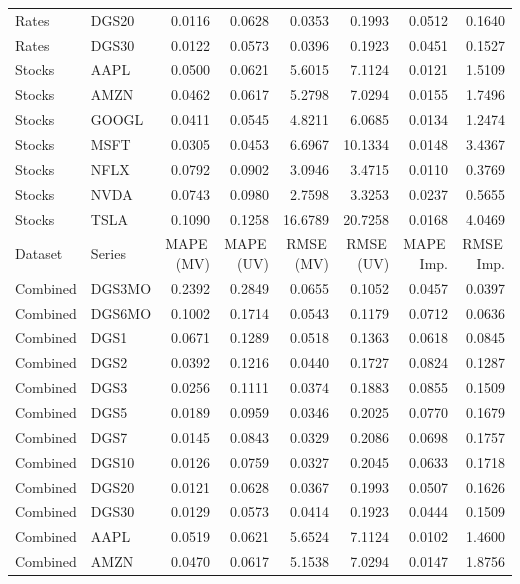 \documentclass[twocolumn]{article}
\begin{document}
\begin{table}
{\begin{tabular}{llrrrrrr}
Rates & DGS20 & 0.0116 & 0.0628 & 0.0353 & 0.1993 & 0.0512 & 0.1640 \\
Rates & DGS30 & 0.0122 & 0.0573 & 0.0396 & 0.1923 & 0.0451 & 0.1527 \\
\midrule
Stocks & AAPL  & 0.0500 & 0.0621 & 5.6015  & 7.1124  & 0.0121 & 1.5109 \\
Stocks & AMZN  & 0.0462 & 0.0617 & 5.2798  & 7.0294  & 0.0155 & 1.7496 \\
Stocks & GOOGL & 0.0411 & 0.0545 & 4.8211  & 6.0685  & 0.0134 & 1.2474 \\
Stocks & MSFT  & 0.0305 & 0.0453 & 6.6967  & 10.1334 & 0.0148 & 3.4367 \\
Stocks & NFLX  & 0.0792 & 0.0902 & 3.0946  & 3.4715  & 0.0110 & 0.3769 \\
Stocks & NVDA  & 0.0743 & 0.0980 & 2.7598  & 3.3253  & 0.0237 & 0.5655 \\
Stocks & TSLA  & 0.1090 & 0.1258 & 16.6789 & 20.7258 & 0.0168 & 4.0469 \\
\bottomrule
Dataset & Series & MAPE\,(MV) & MAPE\,(UV) & RMSE\,(MV) & RMSE\,(UV) & MAPE\,Imp. & RMSE\,Imp. \\
\midrule
Combined & DGS3MO & 0.2392 & 0.2849  & 0.0655  & 0.1052  & 0.0457  & 0.0397  \\
Combined & DGS6MO & 0.1002 & 0.1714  & 0.0543  & 0.1179  & 0.0712  & 0.0636  \\
Combined & DGS1   & 0.0671 & 0.1289  & 0.0518  & 0.1363  & 0.0618  & 0.0845  \\
Combined & DGS2   & 0.0392 & 0.1216  & 0.0440  & 0.1727  & 0.0824  & 0.1287  \\
Combined & DGS3   & 0.0256 & 0.1111  & 0.0374  & 0.1883  & 0.0855  & 0.1509  \\
Combined & DGS5   & 0.0189 & 0.0959  & 0.0346  & 0.2025  & 0.0770  & 0.1679  \\
Combined & DGS7   & 0.0145 & 0.0843  & 0.0329  & 0.2086  & 0.0698  & 0.1757  \\
Combined & DGS10  & 0.0126 & 0.0759  & 0.0327  & 0.2045  & 0.0633  & 0.1718  \\
Combined & DGS20  & 0.0121 & 0.0628  & 0.0367  & 0.1993  & 0.0507  & 0.1626  \\
Combined & DGS30  & 0.0129 & 0.0573  & 0.0414  & 0.1923  & 0.0444  & 0.1509  \\
\midrule
Combined & AAPL   & 0.0519 & 0.0621  & 5.6524  & 7.1124  & 0.0102  & 1.4600  \\
Combined & AMZN   & 0.0470 & 0.0617  & 5.1538  & 7.0294  & 0.0147  & 1.8756  \\

\end{tabular}}
\end{table}
\end{document}
